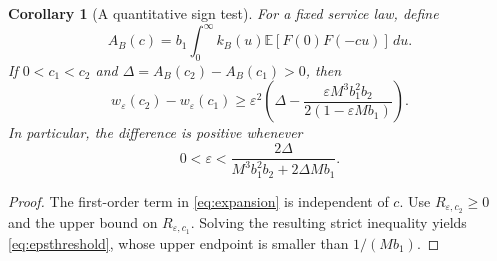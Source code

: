 \documentclass[10pt,a4paper]{amsart}
\numberwithin{equation}{section}
\newtheorem{corollary}[theorem]{Corollary}
\newcommand{\E}{\mathbb E}
\newcommand{\1}{\mathbf 1}
\newcommand{\eps}{\varepsilon}
\begin{document}
\begin{corollary}[A quantitative sign test]\label{cor:signtest}
For a fixed service law, define
\begin{equation}\label{eq:coefficient}
 A_B(c)=b_1\int_0^\infty k_B(u)\E[F(0)F(-cu)]\,du.
\end{equation}
If $0<c_1<c_2$ and $\Delta=A_B(c_2)-A_B(c_1)>0$, then
\begin{equation}\label{eq:signlower}
 w_\eps(c_2)-w_\eps(c_1)
 \ge\eps^2\left(\Delta-
 \frac{\eps M^3b_1^2b_2}{2(1-\eps M b_1)}\right).
\end{equation}
In particular, the difference is positive whenever
\begin{equation}\label{eq:epsthreshold}
 0<\eps<\frac{2\Delta}{M^3b_1^2b_2+2\Delta M b_1}.
\end{equation}
\end{corollary}
\begin{proof}
The first-order term in \eqref{eq:expansion} is independent of $c$. Use $R_{\eps,c_2}\ge0$ and the upper bound on $R_{\eps,c_1}$. Solving the resulting strict inequality yields \eqref{eq:epsthreshold}, whose upper endpoint is smaller than $1/(M b_1)$.
\end{proof}
\end{document}
